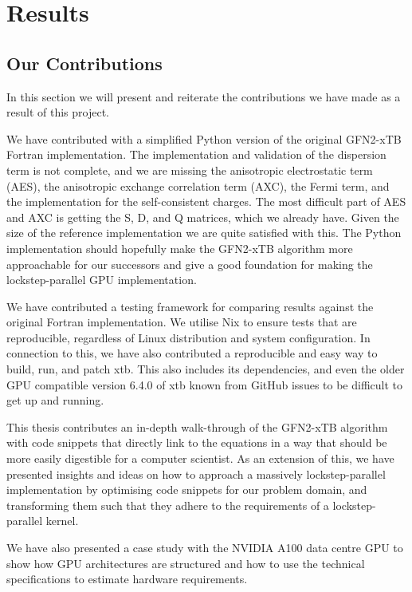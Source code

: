\chapter{Results}\label{sec:results}

\section{Our Contributions}

In this section we will present and reiterate the contributions we have made as a result of this project.

We have contributed with a simplified Python version of the original GFN2-xTB Fortran implementation. The implementation and validation of the dispersion term is not complete, and we are missing the anisotropic electrostatic term (AES), the anisotropic exchange correlation term (AXC), the Fermi term, and the implementation for the self-consistent charges. The most difficult part of AES and AXC is getting the S, D, and Q matrices, which we already have. Given the size of the reference implementation we are quite satisfied with this. The Python implementation should hopefully make the GFN2-xTB algorithm more approachable for our successors and give a good foundation for making the lockstep-parallel GPU implementation.

We have contributed a testing framework for comparing results against the original Fortran implementation. We utilise Nix to ensure tests that are reproducible, regardless of Linux distribution and system configuration. In connection to this, we have also contributed a reproducible and easy way to build, run, and patch xtb. This also includes its dependencies, and even the older GPU compatible version 6.4.0 of xtb known from GitHub issues to be difficult to get up and running.

This thesis contributes an in-depth walk-through of the GFN2-xTB algorithm with code snippets that directly link to the equations in a way that should be more easily digestible for a computer scientist. As an extension of this, we have presented insights and ideas on how to approach a massively lockstep-parallel implementation by optimising code snippets for our problem domain, and transforming them such that they adhere to the requirements of a lockstep-parallel kernel.

We have also presented a case study with the NVIDIA A100 data centre GPU to show how GPU architectures are structured and how to use the technical specifications to estimate hardware requirements.

